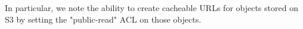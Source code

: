 \documentclass[se]{uw-wkrpt}
\begin{document}
In particular, we note the ability to create cacheable URLs for objects stored 
on S3 by setting the "public-read" ACL on those objects.

\backmatter

%
\printbibliography[heading=bibintoc]

\appendix
\begin{appendices}

\end{appendices}
\end{document}
